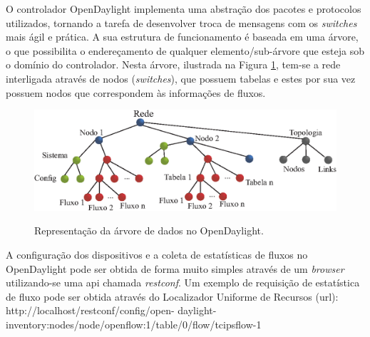 
O controlador OpenDaylight implementa uma abstração dos pacotes e protocolos utilizados, tornando a tarefa de desenvolver troca de mensagens com os \textit{switches} mais ágil e prática.
A sua estrutura de funcionamento é baseada em uma árvore, o que possibilita o endereçamento de qualquer elemento/sub-árvore que esteja sob o domínio do controlador. Nesta árvore, ilustrada na Figura \ref{fig:arvore-dados}, tem-se a rede interligada através de nodos (\textit{switches}), que possuem tabelas e estes por sua vez possuem nodos que correspondem às informações de fluxos.

\begin{figure}[H]
  \centering
  \caption{Representação da árvore de dados no OpenDaylight.}
  \includegraphics[width=1\textwidth]{images/odl-tree.eps}
  \label{fig:arvore-dados}
\end{figure}

A configuração dos dispositivos e a coleta de estatísticas de fluxos no OpenDaylight pode ser obtida de forma muito simples através de um \textit{browser} utilizando-se uma \gls{api} chamada \textit{restconf}. Um exemplo de requisição de estatística de fluxo pode ser obtida através do Localizador Uniforme de Recursos (\gls{url}): http://localhost/restconf/config/open- daylight-inventory:nodes/node/openflow:1/table/0/flow/tcipsflow-1

